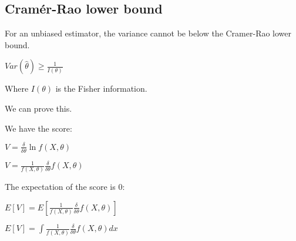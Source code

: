 
\subsection{Cramér-Rao lower bound}

For an unbiased estimator, the variance cannot be below the Cramer-Rao lower bound.

\(Var (\hat \theta )\ge \frac{1}{I(\theta )}\)

Where \(I(\theta )\) is the Fisher information.

We can prove this.

We have the score:

\(V=\frac{\delta }{\delta \theta }\ln f(X, \theta )\)

\(V=\frac{1}{f(X, \theta )}\frac{\delta }{\delta \theta } f(X, \theta )\)

The expectation of the score is \(0\):

\(E[V]=E[\frac{1}{f(X, \theta )}\frac{\delta }{\delta \theta } f(X, \theta )]\)

\(E[V]=\int \frac{1}{f(X, \theta )}\frac{\delta }{\delta \theta } f(X, \theta )dx\)

